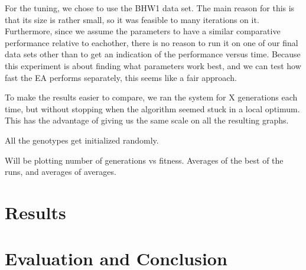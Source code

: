 For the tuning, we chose to use the BHW1 data set. The main reason for this is that its size is rather small, so it was feasible to many iterations on it. Furthermore, since we assume the parameters to have a similar comparative performance relative to eachother, there is no reason to run it on one of our final data sets other than to get an indication of the performance versus time. Because this experiment is about finding what parameters work best, and we can test how fast the EA performs separately, this seems like a fair approach.

To make the results easier to compare, we ran the system for X generations each time, but without stopping when the algorithm seemed stuck in a local optimum. This has the advantage of giving us the same scale on all the resulting graphs.

All the genotypes get initialized randomly.

Will be plotting number of generations vs fitness. Averages of the best of the runs, and averages of averages. 

\section{Results} %
\label{sec:results}


\section{Evaluation and Conclusion} %
\label{sec:evaluation_and_conclusion}


